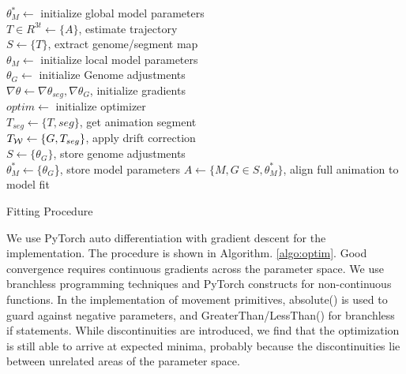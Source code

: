 \begin{algorithm}
    \SetAlgoLined
    $\theta^{*}_{M} \leftarrow$ initialize global model parameters\\
    $T\in R^{3t} \leftarrow \{A\}$, estimate trajectory\\
    $S \leftarrow \{T\}$, extract genome/segment map\\
     {
        $\theta_{M} \leftarrow$ initialize local model parameters\\
        $\theta_{G} \leftarrow$ initialize Genome adjustments\\
        $\nabla{\theta} \leftarrow \nabla{\theta_{seg}},\nabla{\theta_{G}}$, initialize gradients\\
        $optim \leftarrow$ initialize optimizer\\
        $T_{seg} \leftarrow \{T,seg\}$, get animation segment\\
        $T_{\mathcal{W}} \leftarrow \{G,T_{seg}\}$, apply drift correction\\
        $S \leftarrow \{\theta_G\}$, store genome adjustments\\
        $\theta^{*}_{M} \leftarrow \{\theta_G$\}, store model parameters
    }
    $A \leftarrow \{M,G \in S,\theta^{*}_{M}\}$, align full animation to model fit 
    \caption{Fitting Procedure}\label{algo:optim}
    \end{algorithm}
 We use PyTorch auto differentiation with gradient descent for the implementation. The procedure is shown in Algorithm. \ref{algo:optim}. Good convergence requires continuous gradients across the parameter space. We use branchless programming techniques and PyTorch constructs for non-continuous functions. In the implementation of movement primitives, absolute() is used to guard against negative parameters, and GreaterThan/LessThan() for branchless if statements. While discontinuities are introduced, we find that the optimization is still able to arrive at expected minima, probably because the discontinuities lie between unrelated areas of the parameter space.


